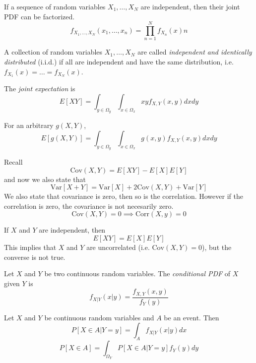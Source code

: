 If a sequence of random variables
$X_1, \dots, X_N$ are independent,
then their joint PDF can be factorized.
\begin{equation}
    f_{X_1,\dots,X_N}(x_1,\dots,x_n) = \prod_{n=1}^{N}f_{X_n}(x)n
\end{equation}

A collection of random variables $X_1, \dots, X_N$ are called
\emph{independent and identically distributed} (i.i.d.) if
all are independent and have the same distribution, i.e.
$f_{X_1}(x) = \dots = f_{X_N}(x)$.

The \emph{joint expectation} is
\begin{equation}
    E[XY] = \int_{y\in \Omega_y}\int_{x\in \Omega_x} xy f_{X,Y}(x,y)dxdy
\end{equation}

For an arbitrary $g(X,Y)$,
\begin{equation}
    E[g(X,Y)] = \int_{y\in \Omega_y}\int_{x\in \Omega_x} g(x,y) f_{X,Y}(x,y)dxdy
\end{equation}

Recall
\begin{equation}
    \text{Cov}(X,Y) = E[XY] - E[X]E[Y]
\end{equation}
and now we also state that
\begin{equation}
    \text{Var}[X+Y] = \text{Var}[X] + 2\text{Cov}(X,Y) + \text{Var}[Y]
\end{equation}
We also state that covariance is zero, then so is the correlation.
However if the correlation is zero, the covariance is not necesarily zero.
\begin{equation}
    \text{Cov}(X,Y) = 0 \implies \text{Corr}(X,y) = 0
\end{equation}

If $X$ and $Y$ are independent, then
\begin{equation}
    E[XY] = E[X]E[Y]
\end{equation}
This implies that $X$ and $Y$ are
uncorrelated (i.e. $\text{Cov}(X,Y) = 0$),
but the converse is not true.

Let $X$ and $Y$ be two continuous random variables.
The \emph{conditional PDF} of $X$ given $Y$ is
\begin{equation}
    f_{X|Y}(x|y) = \frac{f_{X,Y}(x,y)}{f_Y(y)}
\end{equation}

Let $X$ and $Y$ be continuous random variables and
$A$ be an event. Then
\begin{equation}
    P[X \in A | Y=y] = \int_{A} f_{X|Y}(x|y)dx
\end{equation}
\begin{equation}
    P[X\in A] = \int_{\Omega_Y} P[X\in A|Y = y]f_Y(y)dy
\end{equation}

